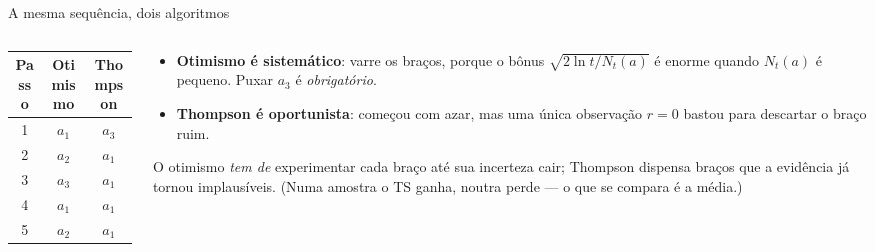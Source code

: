 \documentclass[aspectratio=169, 11pt]{beamer}
\begin{document}
\begin{frame}{A mesma sequência, dois algoritmos}
  \begin{columns}[T]
    \begin{column}{0.42\textwidth}
      \begin{center}\small
      \begin{tabular}{@{}ccc@{}}
        \toprule
        \textbf{Passo} & \textbf{Otimismo} & \textbf{Thompson} \\
        \midrule
        1 & $a_1$ & $a_3$ \\
        2 & $a_2$ & $a_1$ \\
        3 & $a_3$ & $a_1$ \\
        4 & $a_1$ & $a_1$ \\
        5 & $a_2$ & $a_1$ \\
        \bottomrule
      \end{tabular}
      \end{center}
    \end{column}
    \begin{column}{0.55\textwidth}
      \begin{itemize}
        \item \textbf{Otimismo é sistemático}: varre os braços, porque o
              bônus $\sqrt{2\ln t / N_t(a)}$ é enorme quando $N_t(a)$ é
              pequeno. Puxar $a_3$ é \emph{obrigatório}.
        \item \textbf{Thompson é oportunista}: começou com azar, mas uma
              única observação $r=0$ bastou para descartar o braço ruim.
      \end{itemize}

      \begin{ideiabox}
        O otimismo \emph{tem de} experimentar cada braço até sua incerteza
        cair; Thompson dispensa braços que a evidência já tornou
        implausíveis. (Numa amostra o TS ganha, noutra perde — o que se
        compara é a \alert{média}.)
      \end{ideiabox}
    \end{column}
  \end{columns}
\end{frame}
\end{document}
